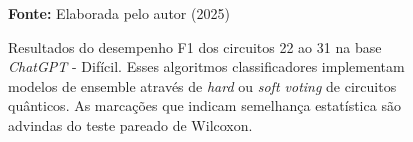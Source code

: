 \begin{figure}
\caption{Resultados do desempenho F1 dos circuitos 22 ao 31 na base \textit{ChatGPT} - Difícil. Esses algoritmos classificadores implementam modelos de ensemble através de \textit{hard} ou \textit{soft voting} de circuitos quânticos. As marcações que indicam semelhança estatística são advindas do teste pareado de Wilcoxon.}
\label{fig:f1:hard:g7}
     \centering
    \centering

      \par\medskip\ABNTEXfontereduzida\selectfont\textbf{Fonte:} Elaborada pelo autor (2025) \par\medskip
\end{figure}